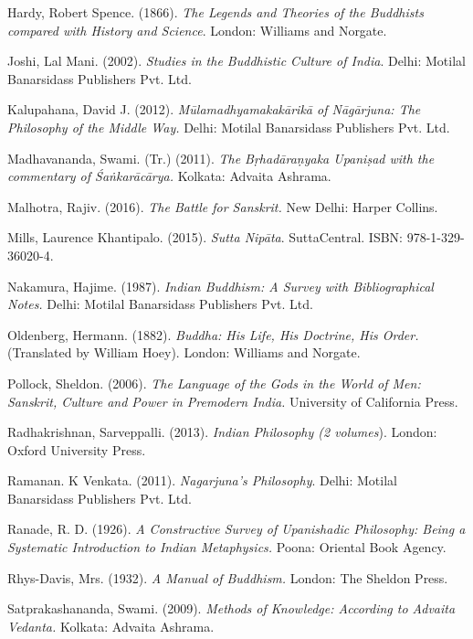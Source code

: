 \begin{thebibliography}{99}
  Hardy, Robert Spence. (1866). \textit{The Legends and Theories of the Buddhists compared with History and Science}. London: Williams and Norgate.

  Joshi, Lal Mani. (2002). \textit{Studies in the Buddhistic Culture of India}. Delhi: Motilal Banarsidass Publishers Pvt. Ltd.

  Kalupahana, David J. (2012). \textit{Mūlamadhyamakakārikā of Nāgārjuna: The Philosophy of the Middle Way.} Delhi: Motilal Banarsidass Publishers Pvt. Ltd.

  Madhavananda, Swami. (Tr.) (2011).  \textit{The Bṛhadāraṇyaka Upaniṣad with the commentary of Śaṅkarācārya.} Kolkata: Advaita Ashrama.

  Malhotra, Rajiv. (2016). \textit{The Battle for Sanskrit.} New Delhi: Harper Collins.

  Mills, Laurence Khantipalo. (2015). \textit{Sutta Nipāta}. SuttaCentral. ISBN: 978-1-329-36020-4.

  Nakamura, Hajime. (1987).\textit{ Indian Buddhism: A Survey with Bibliographical Notes.} Delhi: Motilal Banarsidass Publishers Pvt. Ltd.

  Oldenberg, Hermann. (1882). \textit{Buddha: His Life, His Doctrine, His Order.} (Translated by William Hoey). London: Williams and Norgate.

  Pollock, Sheldon. (2006).\textit{ The Language of the Gods in the World of Men: Sanskrit, Culture and Power in Premodern India.} University of California Press.

  Radhakrishnan, Sarveppalli. (2013). \textit{Indian Philosophy (2 volumes}). London: Oxford University Press.

  Ramanan. K Venkata. (2011). \textit{Nagarjuna’s Philosophy}. Delhi: Motilal Banarsidass Publishers Pvt. Ltd.

  Ranade, R. D. (1926). \textit{A Constructive Survey of Upanishadic Philosophy: Being a Systematic Introduction to Indian Metaphysics.} Poona: Oriental Book Agency.

  Rhys-Davis, Mrs. (1932). \textit{A Manual of Buddhism.} London: The Sheldon Press.

  Satprakashananda, Swami. (2009). \textit{Methods of Knowledge: According to Advaita Vedanta.} Kolkata: Advaita Ashrama.


\end{thebibliography}
